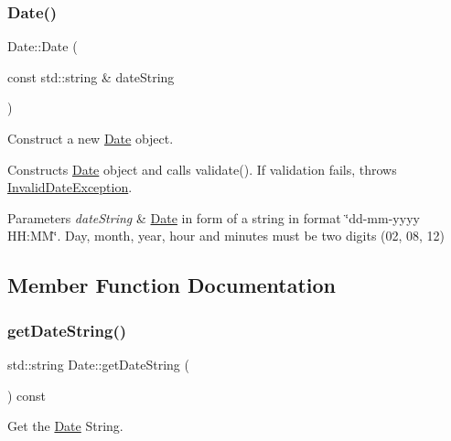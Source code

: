 \subsubsection{\texorpdfstring{Date()}{Date()}\hspace{0.1cm}{\footnotesize\ttfamily [2/2]}}
{\footnotesize\ttfamily Date\+::\+Date (\begin{DoxyParamCaption}\item[{const std\+::string \&}]{date\+String }\end{DoxyParamCaption})\hspace{0.3cm}{\ttfamily [explicit]}}



Construct a new \mbox{\hyperlink{classDate}{Date}} object. 

Constructs \mbox{\hyperlink{classDate}{Date}} object and calls validate(). If validation fails, throws \mbox{\hyperlink{classInvalidDateException}{Invalid\+Date\+Exception}}.


\begin{DoxyParams}{Parameters}
{\em date\+String} & \mbox{\hyperlink{classDate}{Date}} in form of a string in format \char`\"{}dd-\/mm-\/yyyy H\+H\+:\+M\+M\char`\"{}. Day, month, year, hour and minutes must be two digits (\textquotesingle{}02\textquotesingle{}, \textquotesingle{}08\textquotesingle{}, \textquotesingle{}12\textquotesingle{}) \\
\hline
\end{DoxyParams}


\subsection{Member Function Documentation}
\mbox{\label{classDate_a733c89177097f0d7f5cc2f68f5593856}} 
\subsubsection{\texorpdfstring{get\+Date\+String()}{getDateString()}}
{\footnotesize\ttfamily std\+::string Date\+::get\+Date\+String (\begin{DoxyParamCaption}{ }\end{DoxyParamCaption}) const}



Get the \mbox{\hyperlink{classDate}{Date}} String. 

